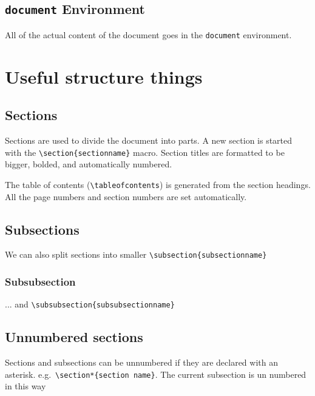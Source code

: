 \documentclass{article}
\begin{document}
\subsection{\lstinline{document} Environment}
All of the actual content of the document goes in the \lstinline{document} environment.

\section{Useful structure things} %

\subsection{Sections}
Sections are used to divide the document into parts. A new section is started with the \lstinline|\section{sectionname}| macro. Section titles are formatted to be bigger, bolded, and automatically numbered.

The table of contents (\lstinline{\tableofcontents}) is generated from the section headings. All the page numbers and section numbers are set automatically.

\subsection{Subsections}
We can also split sections into smaller \lstinline|\subsection{subsectionname}|
\subsubsection{Subsubsection}
... and \lstinline|\subsubsection{subsubsectionname}|

\subsection*{Unnumbered sections}
Sections and subsections can be unnumbered if they are declared with an asterisk. e.g.\ \lstinline|\section*{section name}|. The current subsection is un numbered in this way
\end{document}
